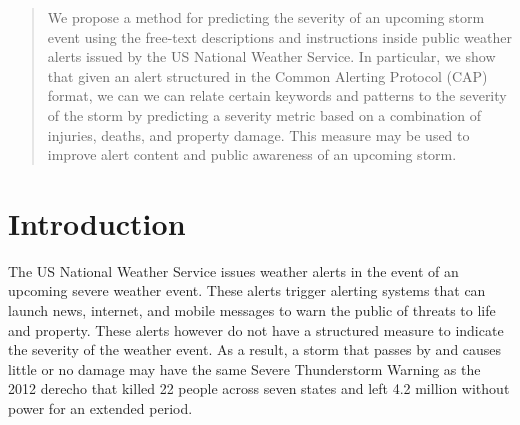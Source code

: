 \documentclass{article}
\begin{document}
 


\begin{abstract}
We propose a method for predicting the severity of an upcoming storm event using the free-text descriptions and instructions inside public weather alerts issued by the US National Weather Service. In particular, we show that given an alert structured in the Common Alerting Protocol (CAP) format, we can we can relate certain keywords and patterns to the severity of the storm by predicting a severity metric based on a combination of injuries, deaths, and property damage. This measure may be used to improve alert content and public awareness of an upcoming storm.
\end{abstract}

\section{Introduction}
\label{introduction}
The US National Weather Service issues weather alerts in the event of an upcoming severe weather event. These alerts trigger alerting systems that can launch news, internet, and mobile messages to warn the public of threats to life and property. These alerts however do not have a structured measure to indicate the severity of the weather event. As a result, a storm that passes by and causes little or no damage may have the same Severe Thunderstorm Warning as the 2012 derecho that killed 22 people across seven states and left 4.2 million without power for an extended period.
\end{document}
